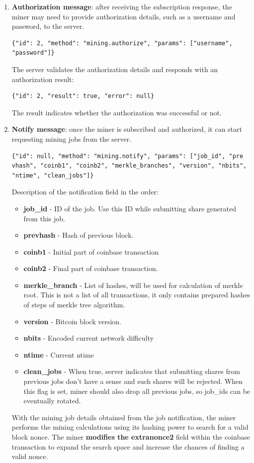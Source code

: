 \begin{enumerate}
    \item \textbf{Authorization message}: after receiving the subscription response, the miner may need to provide authorization details, such as a username and password, to the server.
    \begin{verbatim}
{"id": 2, "method": "mining.authorize", "params": ["username", 
"password"]}
    \end{verbatim}
    The server validates the authorization details and responds with an authorization result:
    \begin{verbatim}
{"id": 2, "result": true, "error": null}
    \end{verbatim}
    The result indicates whether the authorization was successful or not.
    \item \textbf{Notify message}: once the miner is subscribed and authorized, it can start requesting mining jobs from the server. 
    \begin{verbatim}
{"id": null, "method": "mining.notify", "params": ["job_id", "pre
vhash", "coinb1", "coinb2", "merkle_branches", "version", "nbits",
"ntime", "clean_jobs"]}
    \end{verbatim}
    Description of the notification field in the order:
    \begin{itemize}
        \item \textbf{job\_id} - ID of the job. Use this ID while submitting share generated from this job.
        \item \textbf{prevhash} - Hash of previous block.
        \item \textbf{coinb1} - Initial part of coinbase transaction
        \item \textbf{coinb2} - Final part of coinbase transaction.
        \item \textbf{merkle\_branch} - List of hashes, will be used for calculation of merkle root. This is not a list of all transactions, it only contains prepared hashes of steps of merkle tree algorithm.
        \item \textbf{version} - Bitcoin block version.
        \item \textbf{nbits} - Encoded current network difficulty
        \item \textbf{ntime} - Current ntime
        \item \textbf{clean\_jobs} - When true, server indicates that submitting shares from previous jobs don't have a sense and such shares will be rejected. When this flag is set, miner should also drop all previous jobs, so job\_ids can be eventually rotated.
    \end{itemize}
    \medskip
    With the mining job details obtained from the job notification, the miner performs the mining calculations using its hashing power to search for a valid block nonce. The miner \textbf{modifies the extranonce2} field within the coinbase transaction to expand the search space and increase the chances of finding a valid nonce.
    

\end{enumerate}
